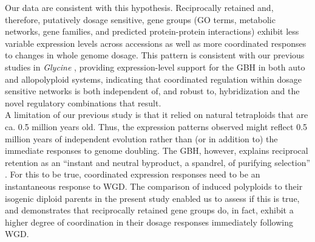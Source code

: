 \documentclass[11pt]{article}
\begin{document}
Our data are consistent with this hypothesis.
Reciprocally retained and, therefore, putatively dosage sensitive, gene groups (GO terms, metabolic networks, gene families, and predicted protein-protein interactions) exhibit less variable expression levels across accessions as well as more coordinated responses to changes in whole genome dosage.
This pattern is consistent with our previous studies in \textit{Glycine} \citep{coate2016}, providing expression-level support for the GBH in both auto and allopolyploid systems, indicating that coordinated regulation within dosage sensitive networks is both independent of, and robust to, hybridization and the novel regulatory combinations that result.\\

A limitation of our previous study \citep{coate2016} is that it relied on natural tetraploids that are ca. 0.5 million years old.
Thus, the expression patterns observed might reflect 0.5 million years of independent evolution rather than (or in addition to) the immediate responses to genome doubling.
The GBH, however, explains  reciprocal retention as an ``instant and neutral byproduct, a spandrel, of purifying selection'' \citep{freeling2009}.
For this to be true, coordinated expression responses need to be an instantaneous response to WGD.
The comparison of induced polyploids to their isogenic diploid parents in the present study enabled us to assess if this is true, and demonstrates that reciprocally retained gene groups do, in fact, exhibit a higher degree of coordination in their dosage responses immediately following WGD.\\
\end{document}
